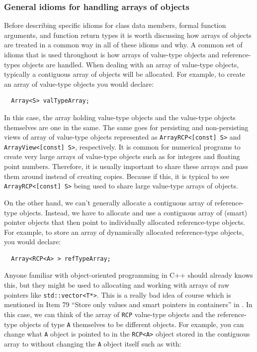 \documentclass[pdf,ps2pdf,11pt]{SANDreport}
\begin{document}
%
{}\subsubsection{General idioms for handling arrays of objects}
%

Before describing specific idioms for class data members, formal
function arguments, and function return types it is worth discussing
how arrays of objects are treated in a common way in all of these
idioms and why.  A common set of idioms that is used throughout is how
arrays of value-type objects and reference-types objects are handled.
When dealing with an array of value-type objects, typically a
contiguous array of objects will be allocated.  For example, to create
an array of value-type objects you would declare:

{\small\begin{verbatim}
  Array<S> valTypeArray;
\end{verbatim}}

In this case, the array holding value-type objects and the value-type
objects themselves are one in the same.  The same goes for persisting
and non-persisting views of array of value-type objects represented as
{}\texttt{ArrayRCP<[const] S>} and {}\texttt{ArrayView<[const] S>},
respectively.  It is common for numerical programs to create very
large arrays of value-type objects such as for integers and floating
point numbers.  Therefore, it is usually important to share these
arrays and pass them around instead of creating copies.  Because if
this, it is typical to see {}\texttt{ArrayRCP<[const] S>} being used
to share large value-type arrays of objects.

On the other hand, we can't generally allocate a contiguous array of
reference-type objects.  Instead, we have to allocate and use a
contiguous array of (smart) pointer objects that then point to
individually allocated reference-type objects.  For example, to store
an array of dynamically allocated reference-type objects, you would
declare:

{\small\begin{verbatim}
  Array<RCP<A> > refTypeArray;
\end{verbatim}}

Anyone familiar with object-oriented programming in C++ should already
knows this, but they might be used to allocating and working with
arrays of raw pointers like {}\texttt{std::vector<T*>}.  This is a
really bad idea of course which is mentioned in Item 79 ``Store only
values and smart pointers in containers'' in
{}\cite{C++CodingStandards05}.  In this case, we can think of the
array of {}\texttt{RCP} value-type objects and the reference-type
objects of type {}\texttt{A} themselves to be different objects.  For
example, you can change what {}\texttt{A} object is pointed to in the
{}\texttt{RCP<A>} object stored in the contiguous array to without
changing the {}\texttt{A} object itself such as with:
\end{document}
